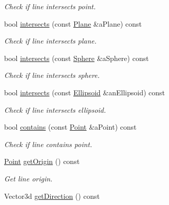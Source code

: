 \begin{DoxyCompactItemize}
\begin{DoxyCompactList}\small\item\em Check if line intersects point. \end{DoxyCompactList}\item 
bool \hyperlink{classostk_1_1math_1_1geom_1_1d3_1_1objects_1_1_line_a292e86df1d673e4f040691b25877a6ce}{intersects} (const \hyperlink{classostk_1_1math_1_1geom_1_1d3_1_1objects_1_1_plane}{Plane} \&a\+Plane) const
\begin{DoxyCompactList}\small\item\em Check if line intersects plane. \end{DoxyCompactList}\item 
bool \hyperlink{classostk_1_1math_1_1geom_1_1d3_1_1objects_1_1_line_a5300ab7d6cbe87cf74de014252956558}{intersects} (const \hyperlink{classostk_1_1math_1_1geom_1_1d3_1_1objects_1_1_sphere}{Sphere} \&a\+Sphere) const
\begin{DoxyCompactList}\small\item\em Check if line intersects sphere. \end{DoxyCompactList}\item 
bool \hyperlink{classostk_1_1math_1_1geom_1_1d3_1_1objects_1_1_line_a72843cbf3252ed608969e7c4d9a1592f}{intersects} (const \hyperlink{classostk_1_1math_1_1geom_1_1d3_1_1objects_1_1_ellipsoid}{Ellipsoid} \&an\+Ellipsoid) const
\begin{DoxyCompactList}\small\item\em Check if line intersects ellipsoid. \end{DoxyCompactList}\item 
bool \hyperlink{classostk_1_1math_1_1geom_1_1d3_1_1objects_1_1_line_a51121a95b14948a800a36f57aa85e55a}{contains} (const \hyperlink{classostk_1_1math_1_1geom_1_1d3_1_1objects_1_1_point}{Point} \&a\+Point) const
\begin{DoxyCompactList}\small\item\em Check if line contains point. \end{DoxyCompactList}\item 
\hyperlink{classostk_1_1math_1_1geom_1_1d3_1_1objects_1_1_point}{Point} \hyperlink{classostk_1_1math_1_1geom_1_1d3_1_1objects_1_1_line_afc9e2dbb4641c031b91c4b8019a41b69}{get\+Origin} () const
\begin{DoxyCompactList}\small\item\em Get line origin. \end{DoxyCompactList}\item 
Vector3d \hyperlink{classostk_1_1math_1_1geom_1_1d3_1_1objects_1_1_line_a7f312d93308a5f0a876d69c46662838b}{get\+Direction} () const

\end{DoxyCompactItemize}

